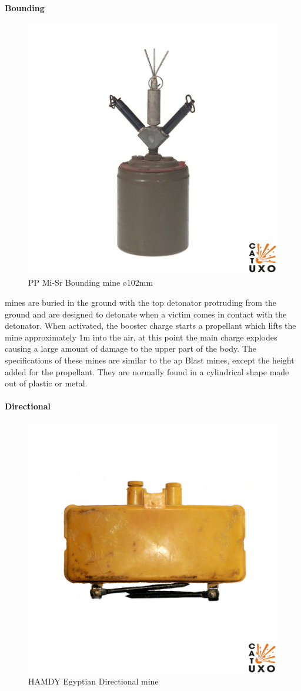 \paragraph{Bounding}

\begin{figure}
\vspace{-8mm}
\centering
\includegraphics[width=0.5\linewidth]{00 - Images/pp-mi-sr-001.jpg}
  \caption{PP Mi-Sr Bounding mine ø102mm\cite{pp-mi-sr}}
  \label{fig:pp-mi-sr}
\end{figure}

mines are buried in the ground with the top detonator protruding from the ground and are designed to detonate when a victim comes in contact with the detonator. When activated, the booster charge starts a propellant which lifts the mine approximately 1m into the air, at this point the main charge explodes causing a large amount of damage to the upper part of the body. The specifications of these mines are similar to the \gls{ap} Blast mines, except the height added for the propellant. They are normally found in a cylindrical shape made out of plastic or metal. \cite{mine_detection}


\paragraph{Directional}

\begin{figure}
\vspace{-8mm}
\centering
\includegraphics[width=0.5\linewidth]{00 - Images/hamd-y-001.jpg}
  \caption{HAMDY Egyptian Directional mine \cite{hamdy}}
  \label{fig:hamdy}
\end{figure}

